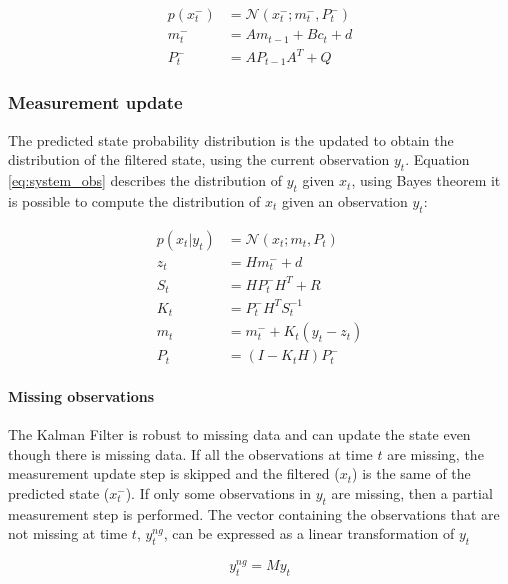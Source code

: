 \documentclass{article}
\newcommand{\norm}[3]{\mathcal{N}\left(#1; #2, #3\right)} %
\begin{document}
\begin{align}\label{eq:time_update}
    p(x^-_t) &= \norm{x_t^-}{m_t^-}{ P_t^-}\\
    m_t^- &= Am_{t-1} + B c_t + d \label{eq:time_update_mean}\\
    P_t^- &= AP_{t-1}A^T + Q \label{eq:time_update_cov}
\end{align} 


\subsubsection{Measurement update}

The predicted state probability distribution is the updated to obtain the distribution of the filtered state, using the current observation $y_t$. Equation \ref{eq:system_obs} describes the distribution of $y_t$ given $x_t$, using Bayes theorem it is possible to compute the distribution of $x_t$ given an observation $y_t$:

\begin{align}
 p(x_t|y_t) &= \mathcal{N}(x_t; m_t, P_t) \label{eq:meas_update}\\
 z_t &= Hm_t^- + d \label{eq:meas_update:obs_mean}\\
 S_t &= HP_t^-H^T + R \label{eq:meas_update:obs_cov}\\
 K_t &= P_t^-H^TS_t^{-1} \label{eq:meas_update:kalman_gain}\\
 m_t &= m_t^- + K_t(y_t - z_t) \label{eq:meas_update:state_mean}\\
 P_t &= (I-K_tH)P_t^- \label{eq:meas_update:state_cov}
\end{align}
    
\paragraph{Missing observations}

The Kalman Filter is robust to missing data and can update the state even though there is missing data. 
If all the observations at time $t$ are missing, the measurement update step is skipped and the filtered ($x_t$) is the same of the predicted state ($x_t^-$). If only some observations in $y_t$ are missing, then a partial measurement step is performed.
The vector containing the observations that are not missing at time $t$, $y^{ng}_t$, can be expressed as a linear transformation of $y_t$

\begin{equation}\label{eq:miss_obs}
    y^{ng}_t = My_t
\end{equation}
\end{document}
